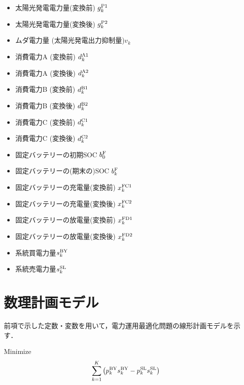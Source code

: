 \documentclass{jarticle}
\newcommand{\IB}{$\bullet$}
\newcommand{\IC}{$\circ$}
\begin{document}
 \begin{itemize}
  \item[\IB] 太陽光発電電力量(変換前) $g^{\rm P1}_{k}$
  \item[\IC] 太陽光発電電力量(変換後) $g^{\rm P2}_{k}$
  \item[\IC] ムダ電力量 (太陽光発電出力抑制量)$v_{k}$ \\[-2.5ex]
  \item[\IC] 消費電力A (変換前) $d^{\rm A1}_{k}$
  \item[\IB] 消費電力A (変換後) $d^{\rm A2}_{k}$
  \item[\IC] 消費電力B (変換前) $d^{\rm B1}_{k}$
  \item[\IB] 消費電力B (変換後) $d^{\rm B2}_{k}$
  \item[\IC] 消費電力C (変換前) $d^{\rm C1}_{k}$
  \item[\IB] 消費電力C (変換後) $d^{\rm C2}_{k}$
  \item[\IB] 固定バッテリーの初期SOC $b^{\rm F}_{0}$
  \item[\IC] 固定バッテリーの(期末の)SOC $b^{\rm F}_{k}$
  \item[\IC] 固定バッテリーの充電量(変換前) $x^{\rm FC1}_{k}$
  \item[\IC] 固定バッテリーの充電量(変換後) $x^{\rm FC2}_{k}$
  \item[\IC] 固定バッテリーの放電量(変換前) $x^{\rm FD1}_{k}$
  \item[\IC] 固定バッテリーの放電量(変換後) $x^{\rm FD2}_{k}$ \\[-2.5ex]

  \item[\IC] 系統買電力量$s^{\rm BY}_{k}$
  \item[\IC] 系統売電力量$s^{\rm SL}_{k}$
\end{itemize}


\section{数理計画モデル}

前項で示した定数・変数を用いて，電力運用最適化問題の線形計画モデルを示す．
%

\noindent
{\rm Minimize}
\begin{equation}
 \sum_{k=1}^{K} \left( p^{\rm BY}_{k}s^{\rm BY}_{k} - p^{\rm SL}_{k}s^{\rm SL}_{k} \right)
 \label{eq:minimize}
\end{equation}
\end{document}
